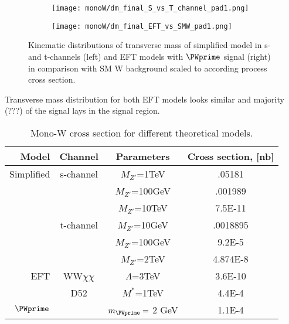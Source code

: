 \begin{figure}[]
\begin{subfigure}{.5\textwidth}
  \centering
  \texttt{[image: monoW/dm\_final\_S\_vs\_T\_channel\_pad1.png]} 
\end{subfigure}%
\begin{subfigure}{.5\textwidth}
  \centering
  \texttt{[image: monoW/dm\_final\_EFT\_vs\_SMW\_pad1.png]}
\end{subfigure}
\caption{Kinematic distributions of transverse mass of simplified model in s- and t-channels (left) 
and EFT models with $\PWprime$ signal (right) in comparison with SM W background scaled to according process cross section.}
  \label{fig:scaledKin}
\end{figure}

Transverse mass distribution for both EFT models looks similar and majority (???) of the signal lays in the signal region. 


\begin{table}[]
  \begin{tabular}{r|c|c|c}
    Model 	& Channel 	  & Parameters	    & Cross section, [nb] \\
    \midrule
    Simplified  & s-channel	  & $M_{Z'}$=1TeV    & .05181 \\
		&		  & $M_{Z'}$=100GeV  & .001989 \\
		&		  & $M_{Z'}$=10TeV   & 7.5E-11 \\
		& t-channel	  & $M_{Z'}$=10GeV   & .0018895 \\
		&		  & $M_{Z'}$=100GeV  & 9.2E-5 \\
		&		  & $M_{Z'}$=2TeV    & 4.874E-8 \\
    \midrule
EFT 	& WW$\chi\chi$	  & $\Lambda$=3TeV    & 3.6E-10 \\
	& D52		  & $M^{*}$=1TeV	& 4.4E-4 \\
    \midrule	
$\PWprime$ 	& 	  & $m_{\PWprime} =$ 2 GeV   & 1.1E-4 \\    
  \end{tabular}
  \caption{Mono-W cross section for different theoretical models.}
  \label{tab:TriggerDetails}
\end{table}


